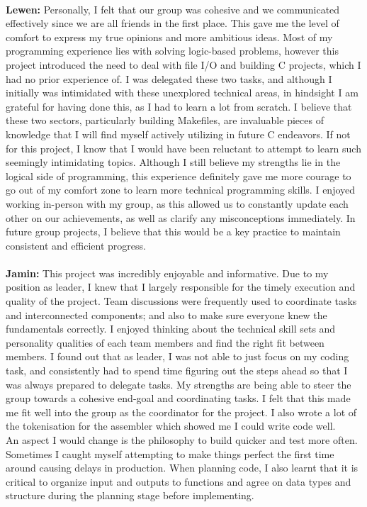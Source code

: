 \documentclass[11pt]{article}
\begin{document}
\\
\textbf{Lewen:} Personally, I felt that our group was cohesive and we communicated effectively since we are all friends in the first place. This gave me the level of comfort to express my true opinions and more ambitious ideas. Most of my programming experience lies with solving logic-based problems, however this project introduced the need to deal with file I/O and building C projects, which I had no prior experience of. I was delegated these two tasks, and although I initially was intimidated with these unexplored technical areas, in hindsight I am grateful for having done this, as I had to learn a lot from scratch. I believe that these two sectors, particularly building Makefiles, are invaluable pieces of knowledge that I will find myself actively utilizing in future C endeavors. If not for this project, I know that I would have been reluctant to attempt to learn such seemingly intimidating topics. Although I still believe my strengths lie in the logical side of programming, this experience definitely gave me more courage to go out of my comfort zone to learn more technical programming skills. I enjoyed working in-person with my group, as this allowed us to constantly update each other on our achievements, as well as clarify any misconceptions immediately. In future group projects, I believe that this would be a key practice to maintain consistent and efficient progress.\\
\\
\textbf{Jamin:} This project was incredibly enjoyable and informative. Due to my position as leader, I knew that I largely responsible for the timely execution and quality of the project. Team discussions were frequently used to coordinate tasks and interconnected components; and also to make sure everyone knew the fundamentals correctly. I enjoyed thinking about the technical skill sets and personality qualities of each team members and find the right fit between members. I found out that as leader, I was not able to just focus on my coding task, and consistently had to spend time figuring out the steps ahead so that I was always prepared to delegate tasks. My strengths are being able to steer the group towards a cohesive end-goal and coordinating tasks. I felt that this made me fit well into the group as the coordinator for the project. I also wrote a lot of the tokenisation for the assembler which showed me I could write code well.\\
An aspect I would change is the philosophy to build quicker and test more often. Sometimes I caught myself attempting to make things perfect the first time around causing delays in production. When planning code, I also learnt that it is critical to organize input and outputs to functions and agree on data types and structure during the planning stage before implementing.
\end{document}

